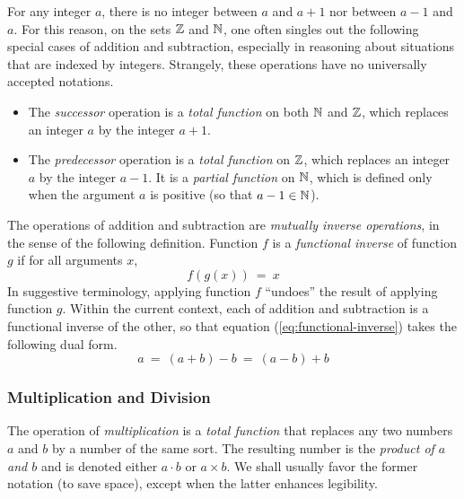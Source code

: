 \medskip

 
For any integer $a$, there is no integer between $a$ and $a+1$ nor between $a-1$ and $a$. For this reason, on the sets $\mathbb{Z}$ and $\mathbb{N}$, one often singles out the following special cases of addition and subtraction, especially in reasoning about situations that are indexed by integers.  Strangely, these operations have no universally accepted notations.
\begin{itemize}
\item
The {\it successor} operation is a {\em total function} on both $\mathbb{N}$ and $\mathbb{Z}$, which replaces an
integer $a$ by the integer $a+1$.
\item
The {\it predecessor} operation is a {\em total function} on $\mathbb{Z}$, which replaces an integer $a$ by the integer $a-1$.  It is a {\em partial function} on $\mathbb{N}$, which is defined only when the argument $a$ is positive (so that $a-1 \in \mathbb{N}$).
\end{itemize}

\smallskip

The operations of addition and subtraction are {\em mutually inverse operations}, in the sense of the following definition.  Function $f$ is a {\it functional inverse} of function $g$ if for all arguments $x$,
\begin{equation}
\label{eq:functional-inverse}
f(g(x)) \ = \ x
\end{equation}
In suggestive terminology, applying function $f$ ``undoes'' the result of applying function $g$.  Within the current context, each of addition and subtraction is a functional inverse of the other, so that equation (\ref{eq:functional-inverse}) takes the following dual form.
\[ a \ = \ (a+b) -b \ = \ (a-b) +b \]

\subsubsection{Multiplication and Division}
 
 
 

The operation of {\it multiplication} is a {\em total function} that replaces any two numbers $a$ and $b$ by a number of the same sort.  The resulting number is the {\em product of $a$ and $b$} and is denoted either $a \cdot b$  or $a \times b$.  We shall usually favor the former notation (to save space), except when the latter enhances legibility.

